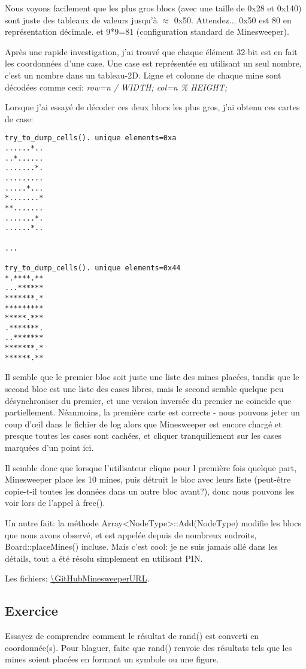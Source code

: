 Nous voyons facilement que les plus gros blocs (avec une taille de 0x28 et 0x140) sont
juste des tableaux de valeurs jusqu'à $\approx$ 0x50.
Attendez... 0x50 est 80 en représentation décimale. et 9*9=81 (configuration standard
de Minesweeper).

Après une rapide investigation, j'ai trouvé que chaque élément 32-bit est en fait
les coordonnées d'une case.
Une case est représentée en utilisant un seul nombre, c'est un nombre dans un tableau-2D.
Ligne et colonne de chaque mine sont décodées comme ceci: \emph{row=n / WIDTH; col=n \% HEIGHT;}

Lorsque j'ai essayé de décoder ces deux blocs les plus gros, j'ai obtenu ces
cartes de case:

\begin{lstlisting}
try_to_dump_cells(). unique elements=0xa
......*..
..*......
.......*.
.........
.....*...
*.......*
**.......
.......*.
......*..

...

try_to_dump_cells(). unique elements=0x44
*.****.**
...******
*******.*
*********
*****.***
.*******.
..*******
*******.*
******.**
\end{lstlisting}

Il semble que le premier bloc soit juste une liste des mines placées, tandis que le
second bloc est une liste des cases libres, mais le second semble quelque peu désynchroniser
du premier, et une version inversée du premier ne coïncide que partiellement.
Néanmoins, la première carte est correcte - nous pouvons jeter un coup d'\oe{}il
dans le fichier de log alors que Minesweeper est encore chargé et presque toutes
les cases sont cachées, et cliquer tranquillement sur les cases marquées d'un point
ici.

Il semble donc que lorsque l'utilisateur clique pour l première fois quelque part,
Minesweeper place les 10 mines, puis détruit le bloc avec leurs liste (peut-être
copie-t-il toutes les données dans un autre bloc avant?), donc nous pouvons les voir
lors de l'appel à free().

Un autre fait: la méthode Array<NodeType>::Add(NodeType) modifie les blocs que nous
avons observé, et est appelée depuis de nombreux endroits, Board::placeMines() incluse.
Mais c'est cool: je ne suis jamais allé dans les détails, tout a été résolu simplement
en utilisant PIN.

Les fichiers: \url{\GitHubMinesweeperURL}.

\subsection{Exercice}

Essayez de comprendre comment le résultat de rand() est converti en coordonnée(s).
Pour blaguer, faite que rand() renvoie des résultats tels que les mines
soient placées en formant un symbole ou une figure.
